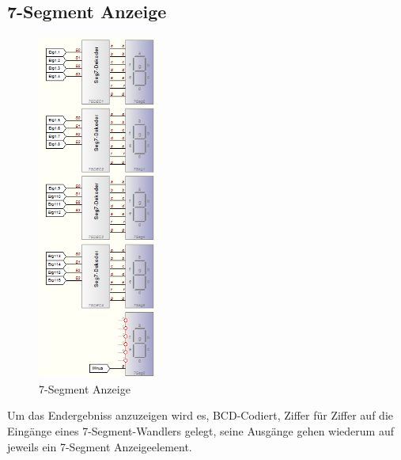 \documentclass[a4paper,12pt,fleqn,oneside]{article}
\begin{document}
	\subsection{7-Segment Anzeige}
		\begin{figure}[h]
			\center
			\includegraphics[width=0.35\textwidth]{7_segment_anzeige}
			\caption{7-Segment Anzeige}
			\label{fig:7_segment_anzeige}
		\end{figure}
		\FloatBarrier
		
	
	\noindent	
	Um das Endergebniss anzuzeigen wird es, BCD-Codiert, Ziffer für Ziffer auf die Eingänge eines 
	7-Segment-Wandlers gelegt, seine Ausgänge gehen wiederum auf jeweils ein 7-Segment Anzeigeelement.
\end{document}

